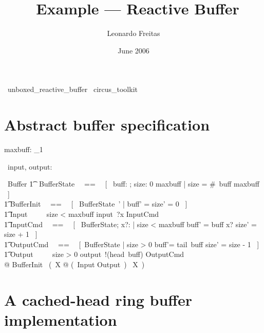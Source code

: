 \documentclass{article}
\begin{document}
\title{\Circus\ Example --- Reactive Buffer}
\author{Leonardo Freitas}
\date{June 2006}

\maketitle

\begin{zsection}
  \SECTION\ unboxed\_reactive\_buffer \parents\ circus\_toolkit
\end{zsection}

\section{Abstract buffer specification}

\begin{axdef}
  maxbuff: \nat_1
\end{axdef}

\begin{zed}
  \circchannel\ input, output: \nat
\end{zed}

\begin{circus}
  \circprocess\ Buffer \circdef \circbegin
  \also %
    \t1 \circstate\ BufferState ~~==~~ [~ buff: \seq \nat; size: 0 \upto maxbuff | size = \#~buff \leq maxbuff ~] \\ %
    \t1 BufferInit ~~==~~ [~ BufferState~' | buff' = \langle\rangle \land size' = 0 ~] \\
    \t1 Input ~~\circdef~~ \lcircguard size < maxbuff \rcircguard \circguard input~?x \then InputCmd \\
    \t1 InputCmd ~~==~~ [~ \Delta BufferState; x?: \nat | size < maxbuff \land buff' = buff \cat \langle x? \rangle \land size' = size + 1 ~] \\
    \t1 OutputCmd ~~==~~ [~\Delta BufferState | size > 0 \land buff'= tail~buff \land size' = size - 1 ~] \\
    \t1 Output ~~\circdef~~ \lcircguard size > 0 \rcircguard \circguard output~!(head~buff) \then OutputCmd \\
  @ BufferInit \circseq\ (~\circmu X @ (~Input \extchoice Output~) \circseq\ X~) \\
  \circend
\end{circus}


\section{A cached-head ring buffer implementation}
\end{document}
